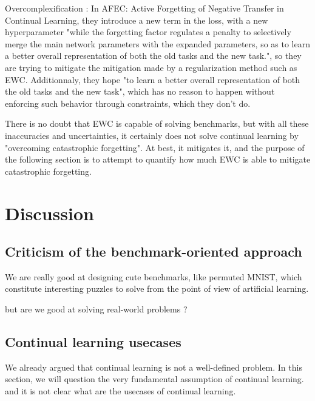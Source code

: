 \documentclass[11pt]{article}
\begin{document}
\vspace{1mm}
\noindent
Overcomplexification : In AFEC: Active Forgetting of Negative Transfer in Continual Learning, they introduce a new term in the loss, with a new hyperparameter "while the forgetting factor regulates a penalty to selectively merge the main network parameters with the expanded parameters, so as to learn a better overall representation of both the old tasks and the new task.", so they are trying to mitigate the mitigation made by a regularization method such as EWC. Additionnaly, they hope "to learn a better overall representation of both the old tasks and the new task", which has no reason to happen without enforcing such behavior through constraints, which they don't do.

There is no doubt that EWC is capable of solving benchmarks, but with all these inaccuracies and uncertainties, it certainly does not solve continual learning by "overcoming catastrophic forgetting". At best, it mitigates it, and the purpose of the following section is to attempt to quantify how much EWC is able to mitigate catastrophic forgetting.



\section{Discussion}

\subsection{Criticism of the benchmark-oriented approach}

We are really good at designing cute benchmarks, like permuted MNIST, which constitute interesting puzzles to solve from the point of view of artificial learning.

but are we good at solving real-world problems ?

\subsection{Continual learning usecases}

We already argued that continual learning is not a well-defined problem. In this section, we will question the very fundamental assumption of continual learning. and it is not clear what are the usecases of continual learning.
\end{document}

